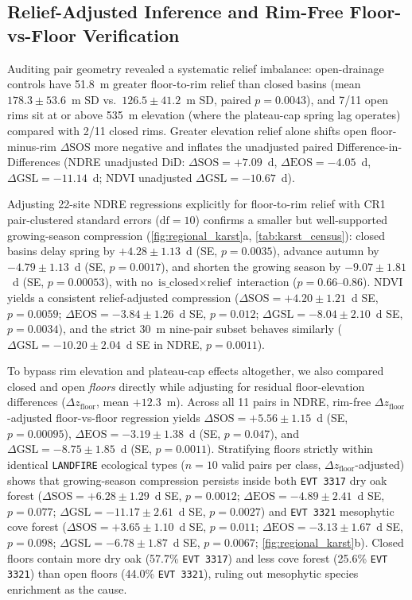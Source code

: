 \subsection{Relief-Adjusted Inference and Rim-Free Floor-vs-Floor Verification}
Auditing pair geometry revealed a systematic relief imbalance: open-drainage controls have 51.8~m greater floor-to-rim relief than closed basins (mean $178.3 \pm 53.6$~m SD vs.\ $126.5 \pm 41.2$~m SD, paired $p=0.0043$), and 7/11 open rims sit at or above 535~m elevation (where the plateau-cap spring lag operates) compared with 2/11 closed rims. Greater elevation relief alone shifts open floor-minus-rim $\Delta\text{SOS}$ more negative and inflates the unadjusted paired Difference-in-Differences (NDRE unadjusted DiD: $\Delta\text{SOS}=+7.09$~d, $\Delta\text{EOS}=-4.05$~d, $\Delta\text{GSL}=-11.14$~d; NDVI unadjusted $\Delta\text{GSL}=-10.67$~d).

Adjusting 22-site NDRE regressions explicitly for floor-to-rim relief with CR1 pair-clustered standard errors ($\text{df}=10$) confirms a smaller but well-supported growing-season compression (\cref{fig:regional_karst}a, \cref{tab:karst_census}): closed basins delay spring by $+4.28 \pm 1.13$~d (SE, $p=0.0035$), advance autumn by $-4.79 \pm 1.13$~d (SE, $p=0.0017$), and shorten the growing season by $-9.07 \pm 1.81$~d (SE, $p=0.00053$), with no $\text{is\_closed} \times \text{relief}$ interaction ($p=0.66$--$0.86$). NDVI yields a consistent relief-adjusted compression ($\Delta\text{SOS}=+4.20 \pm 1.21$~d SE, $p=0.0059$; $\Delta\text{EOS}=-3.84 \pm 1.26$~d SE, $p=0.012$; $\Delta\text{GSL}=-8.04 \pm 2.10$~d SE, $p=0.0034$), and the strict 30~m nine-pair subset behaves similarly ($\Delta\text{GSL}=-10.20 \pm 2.04$~d SE in NDRE, $p=0.0011$).

To bypass rim elevation and plateau-cap effects altogether, we also compared closed and open \emph{floors} directly while adjusting for residual floor-elevation differences ($\Delta z_{\text{floor}}$, mean $+12.3$~m). Across all 11 pairs in NDRE, rim-free $\Delta z_{\text{floor}}$-adjusted floor-vs-floor regression yields $\Delta\text{SOS}=+5.56 \pm 1.15$~d (SE, $p=0.00095$), $\Delta\text{EOS}=-3.19 \pm 1.38$~d (SE, $p=0.047$), and $\Delta\text{GSL}=-8.75 \pm 1.85$~d (SE, $p=0.0011$). Stratifying floors strictly within identical \texttt{LANDFIRE} ecological types ($n=10$ valid pairs per class, $\Delta z_{\text{floor}}$-adjusted) shows that growing-season compression persists inside both \texttt{EVT 3317} dry oak forest ($\Delta\text{SOS}=+6.28 \pm 1.29$~d SE, $p=0.0012$; $\Delta\text{EOS}=-4.89 \pm 2.41$~d SE, $p=0.077$; $\Delta\text{GSL}=-11.17 \pm 2.61$~d SE, $p=0.0027$) and \texttt{EVT 3321} mesophytic cove forest ($\Delta\text{SOS}=+3.65 \pm 1.10$~d SE, $p=0.011$; $\Delta\text{EOS}=-3.13 \pm 1.67$~d SE, $p=0.098$; $\Delta\text{GSL}=-6.78 \pm 1.87$~d SE, $p=0.0067$; \cref{fig:regional_karst}b). Closed floors contain more dry oak (57.7\% \texttt{EVT 3317}) and less cove forest (25.6\% \texttt{EVT 3321}) than open floors (44.0\% \texttt{EVT 3321}), ruling out mesophytic species enrichment as the cause.

